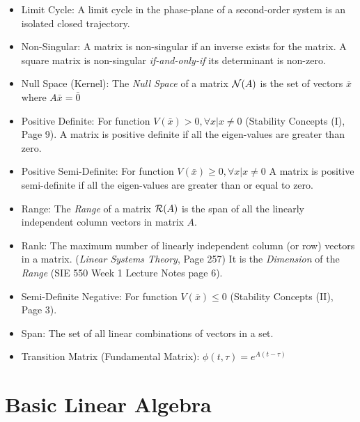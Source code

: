 \documentclass[12pt]{article}
\begin{document}
\begin{itemize}
\item Limit Cycle: A limit cycle in the phase-plane of a second-order system is an isolated closed trajectory. 

\item Non-Singular: A matrix is non-singular if an inverse exists for the matrix. A square matrix is non-singular {\em if-and-only-if} its determinant is non-zero.

\item Null Space (Kernel): The {\em Null Space} of a matrix ${\cal N}(A)$ is the set of vectors $\bar{x}$ where $A\bar{x}=\bar{0}$

\item Positive Definite: For function $V(\bar{x})>0, \forall x | x\neq0$ (Stability Concepts (I), Page 9). A matrix is positive definite if all the eigen-values are greater than zero. 

\item Positive Semi-Definite: For function $V(\bar{x})\geq0, \forall x | x\neq0$ A matrix is positive semi-definite if all the eigen-values are greater than or equal to zero. 

\item Range: The {\em Range} of a matrix ${\cal R}(A)$ is the span of all the linearly independent column vectors in matrix $A$.

\item Rank: The maximum number of linearly independent column (or row) vectors in a matrix. ({\em Linear Systems Theory}, Page 257) It is the { \em Dimension} of the {\em Range} (SIE 550 Week 1 Lecture Notes page 6).

\item Semi-Definite Negative: For function $V(\bar{x})\leq0$ (Stability Concepts (II), Page 3). 

\item Span: The set of all linear combinations of vectors in a set. 

\item Transition Matrix (Fundamental Matrix): $\phi(t,\tau)=e^{A(t-\tau)}$

\end{itemize}

\newpage
\section*{Basic Linear Algebra}
\end{document}
